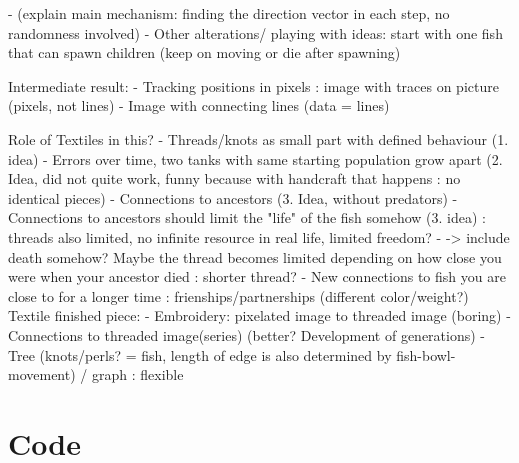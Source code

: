 \documentclass{scrartcl}
\begin{document}
-	(explain main mechanism: finding the direction vector in each step, no randomness involved)
-	Other alterations/ playing with ideas: start with one fish that can spawn children (keep on moving or die after spawning)

Intermediate result:
-	Tracking positions in pixels : image with traces on picture (pixels, not lines)
-	Image with connecting lines (data = lines)

Role of Textiles in this?
-	Threads/knots as small part with defined behaviour (1. idea)
-	Errors over time, two tanks with same starting population grow apart (2. Idea, did not quite work, funny because with handcraft that happens : no identical pieces)
-	Connections to ancestors (3. Idea, without predators)
-	Connections to ancestors should limit the "life" of the  fish somehow (3. idea) : threads also limited, no infinite resource in real life, limited freedom?
-	-> include death somehow? Maybe the thread becomes limited depending on how close you were when your ancestor died : shorter thread?
-	New connections to fish you are close to for a longer time : frienships/partnerships (different color/weight?)
Textile finished piece:
-	Embroidery: pixelated image to threaded image (boring)
-	Connections to threaded image(series) (better? Development of generations)
-	Tree (knots/perls? = fish, length of edge is also determined by fish-bowl-movement) / graph : flexible


\newpage
\section*{Code}


%
%
\end{document}
